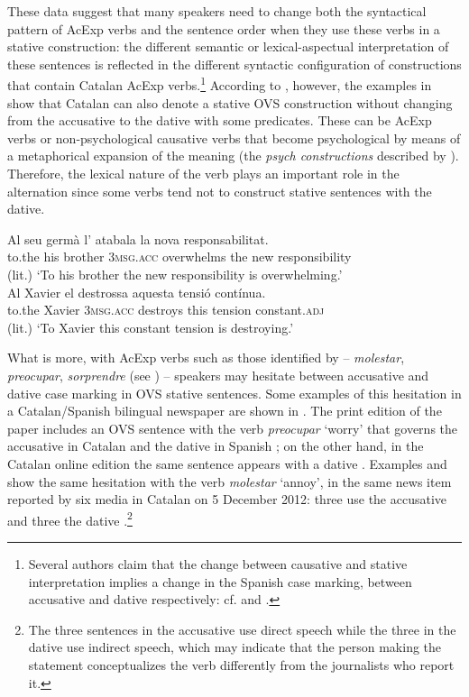 \documentclass[output=paper,colorlinks,citecolor=brown,nonflat,modfonts]{langsci/langscibook}
\begin{document}
These data suggest that many speakers need to change both the syntactical pattern of AcExp verbs and the sentence order when they use these verbs in a stative construction: the different semantic or lexical-aspectual interpretation of these sentences is reflected in the different syntactic configuration of constructions that contain Catalan AcExp verbs.\footnote{Several authors claim that the change between causative and stative interpretation implies a change in the Spanish case marking, between accusative and dative respectively: cf. \citet{Fabregas2015experimentante,Viñas-de-Puig2017} and \citet{Ganeshan2019}.} According to \citep[14, 29--30]{Ginebra2003}, however, the examples in  show that Catalan can also denote a stative OVS construction without changing from the accusative to the dative with some predicates. These can be AcExp verbs  or non-psychological causative verbs that become psychological by means of a metaphorical expansion of the meaning  (the \textit{psych constructions} described by \citealt{Bouchard1995}). Therefore, the lexical nature of the verb plays an important role in the alternation since some verbs tend not to construct stative sentences with the dative.

\ea%
	\citealt[29--30]{Ginebra2003}
 \label{ex:royo:4}
 \ea \label{ex:royo:4a}
 \gll Al seu germà l’ atabala la nova responsabilitat.\\
to.the his brother \textsc{3msg.acc} overwhelms the new  responsibility\\
\glt (lit.) ‘To his brother the new responsibility is overwhelming.’ \\ 
 
 \ex \label{ex:royo:4b}
 \gll Al Xavier el destrossa aquesta tensió contínua.\\
to.the Xavier \textsc{3msg.acc} destroys   this       tension constant.\textsc{adj}\\
 \glt (lit.) ‘To Xavier this constant tension is destroying.’ 
 \z
 \z

What is more, with AcExp verbs such as those identified by \citet{CabréMateu1998} – \textit{molestar}, \textit{preocupar}, \textit{sorprendre} (see ) – speakers may hesitate between accusative and dative case marking in OVS stative sentences. Some examples of this hesitation in a Catalan/Spanish bilingual newspaper are shown in . The print edition of the paper includes an OVS sentence with the verb \textit{preocupar} ‘worry’ that governs the accusative in Catalan  and the dative in Spanish ; on the other hand, in the Catalan online edition the same sentence appears with a dative . Examples  and  show the same hesitation with the verb \textit{molestar} ‘annoy’, in the same news item reported by six media in Catalan on 5 December 2012: three use the accusative  and three the dative .\footnote{The three sentences in the accusative use direct speech while the three in the dative use indirect speech, which may indicate that the person making the statement conceptualizes the verb differently from the journalists who report it.}
\end{document}
